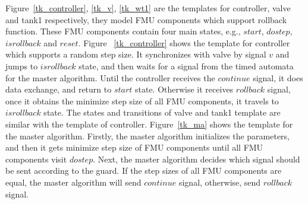 \begin{figure}[htbp]
\end{figure}

Figure~\ref{tk_controller}, \ref{tk_v}, \ref{tk_wt1} are the templates for controller, valve and tank1 respectively, they model FMU components which support rollback function. These FMU components contain four main states, e.g., $start$, $dostep$, $isrollback$ and $reset$. Figure~ \ref{tk_controller} shows the template for controller which supports a random step size. It synchronizes with valve by signal $v$ and jumps to $isrollback$ state, and then waits for a signal from the timed automata for the master algorithm. Until the controller receives the $continue$ signal, it does data exchange, and return to $start$ state. Otherwise it receives $rollback$ signal, once it obtains the minimize step size of all FMU components, it travels to $isrollback$ state. The states and transitions of valve and tank1 template are similar with the template of controller. Figure~\ref{tk_ma} shows the template for the master algorithm. Firstly, the master algorithm initializes the parameters, and then it gets minimize step size of FMU components until all FMU components visit $dostep$. Next, the master algorithm decides which signal should be sent according to the guard. If the step sizes of all FMU components are equal, the master algorithm will send $continue$ signal, otherwise, send $rollback$ signal.

